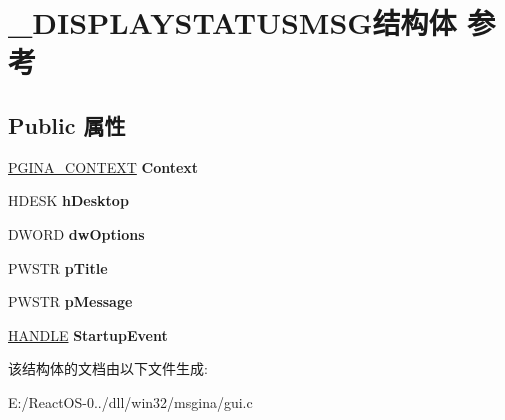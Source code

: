 \hypertarget{struct___d_i_s_p_l_a_y_s_t_a_t_u_s_m_s_g}{}\section{\+\_\+\+D\+I\+S\+P\+L\+A\+Y\+S\+T\+A\+T\+U\+S\+M\+S\+G结构体 参考}
\label{struct___d_i_s_p_l_a_y_s_t_a_t_u_s_m_s_g}
\subsection*{Public 属性}
\begin{DoxyCompactItemize}
\item 
\mbox{\label{struct___d_i_s_p_l_a_y_s_t_a_t_u_s_m_s_g_aea3def4fd306900aa8cd0bbdf560aeb0}} 
\hyperlink{struct_g_i_n_a___c_o_n_t_e_x_t}{P\+G\+I\+N\+A\+\_\+\+C\+O\+N\+T\+E\+XT} {\bfseries Context}
\item 
\mbox{\label{struct___d_i_s_p_l_a_y_s_t_a_t_u_s_m_s_g_a2b4f0a956e1d1aca18566c01f4a8e091}} 
H\+D\+E\+SK {\bfseries h\+Desktop}
\item 
\mbox{\label{struct___d_i_s_p_l_a_y_s_t_a_t_u_s_m_s_g_a6f486ef64d81e783648d183b6b75ae1c}} 
D\+W\+O\+RD {\bfseries dw\+Options}
\item 
\mbox{\label{struct___d_i_s_p_l_a_y_s_t_a_t_u_s_m_s_g_a525f5c6cac876d93d075fa67a708478d}} 
P\+W\+S\+TR {\bfseries p\+Title}
\item 
\mbox{\label{struct___d_i_s_p_l_a_y_s_t_a_t_u_s_m_s_g_a6105e642d50ccf5807590d8d20a2f1f1}} 
P\+W\+S\+TR {\bfseries p\+Message}
\item 
\mbox{\label{struct___d_i_s_p_l_a_y_s_t_a_t_u_s_m_s_g_a357c6a29294df73e80544e2d97daa2f2}} 
\hyperlink{interfacevoid}{H\+A\+N\+D\+LE} {\bfseries Startup\+Event}
\end{DoxyCompactItemize}


该结构体的文档由以下文件生成\+:\begin{DoxyCompactItemize}
\item 
E\+:/\+React\+O\+S-\/0../dll/win32/msgina/gui.\+c\end{DoxyCompactItemize}
